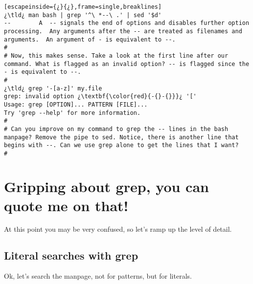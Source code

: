 \begin{lstlisting}[escapeinside={¿}{¿},frame=single,breaklines]
¿\tld¿ man bash | grep '^\ *--\ .' | sed '$d'
--        A  -- signals the end of options and disables further option processing.  Any arguments after the -- are treated as filenames and arguments.  An argument of - is equivalent to --.
#
# Now, this makes sense. Take a look at the first line after our command. What is flagged as an invalid option? -- is flagged since the  - is equivalent to --.
#
¿\tld¿ grep '-[a-z]' my.file
grep: invalid option ¿\textbf{\color{red}{-{}-{}}}¿ '['
Usage: grep [OPTION]... PATTERN [FILE]...
Try 'grep --help' for more information.
#
# Can you improve on my command to grep the -- lines in the bash manpage? Remove the pipe to sed. Notice, there is another line that begins with --. Can we use grep alone to get the lines that I want?
#
\end{lstlisting}

\section{Gripping about grep, you can quote me on that!}

At this point you may be very confused, so let's ramp up the level of detail.

\subsection{Literal searches with grep}

Ok, let's search the  manpage, not for patterns, but for literals. 

